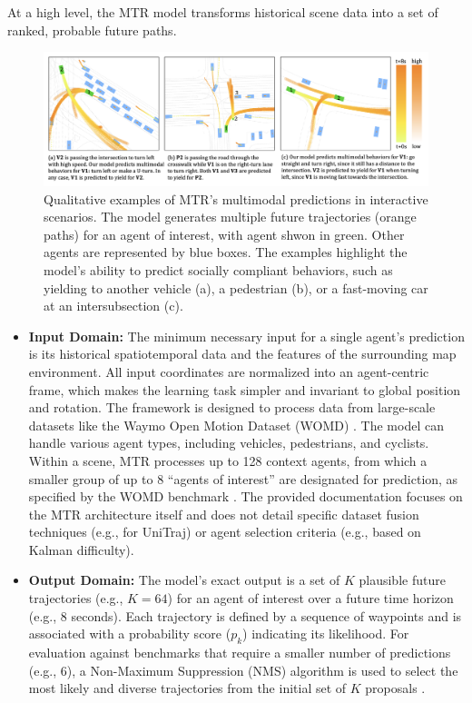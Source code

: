 At a high level, the MTR model transforms historical scene data into a set of ranked, probable future paths.

\begin{figure}[htbp]
    \centering
    \includegraphics[width=\textwidth]{figures/input_output_viz.png}
    \caption{Qualitative examples of MTR's multimodal predictions in interactive scenarios. The model generates multiple future trajectories (orange paths) for an agent of interest, with agent shwon in green. Other agents are represented by blue boxes. The examples highlight the model's ability to predict socially compliant behaviors, such as yielding to another vehicle (a), a pedestrian (b), or a fast-moving car at an intersubsection (c).}
    \label{fig:input_output_example}
\end{figure}

\begin{itemize}
    \item \textbf{Input Domain:} The minimum necessary input for a single agent's prediction is its historical spatiotemporal data and the features of the surrounding map environment. All input coordinates are normalized into an agent-centric frame, which makes the learning task simpler and invariant to global position and rotation. The framework is designed to process data from large-scale datasets like the Waymo Open Motion Dataset (WOMD) \cite{WOMD2021}. The model can handle various agent types, including vehicles, pedestrians, and cyclists. Within a scene, MTR processes up to 128 context agents, from which a smaller group of up to 8 ``agents of interest'' are designated for prediction, as specified by the WOMD benchmark \cite{WOMD2021}. The provided documentation focuses on the MTR architecture itself and does not detail specific dataset fusion techniques (e.g., for UniTraj) or agent selection criteria (e.g., based on Kalman difficulty).
    \item \textbf{Output Domain:} The model's exact output is a set of $K$ plausible future trajectories (e.g., $K=64$) for an agent of interest over a future time horizon (e.g., 8 seconds). Each trajectory is defined by a sequence of waypoints and is associated with a probability score ($p_k$) indicating its likelihood. For evaluation against benchmarks that require a smaller number of predictions (e.g., 6), a Non-Maximum Suppression (NMS) algorithm is used to select the most likely and diverse trajectories from the initial set of $K$ proposals \cite{Shi2022MTR}.
\end{itemize}

